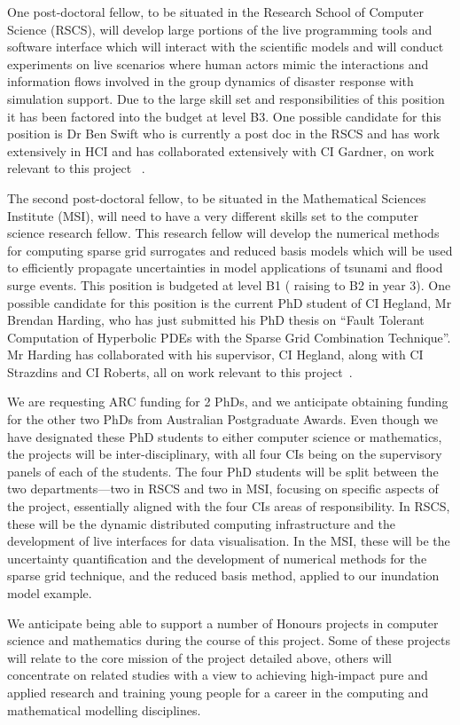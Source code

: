 One post-doctoral fellow, to be situated in the
Research School of Computer Science (RSCS), will develop large
portions of the live programming tools and software interface which
will interact with the scientific models and will conduct experiments
on live scenarios where human actors mimic the interactions and
information flows involved in the group dynamics of disaster response
with simulation support. Due to the large skill set and responsibilities of 
this position it has been factored into the budget at level B3.
One possible candidate for this position is 
Dr Ben Swift who is currently a post doc in the RSCS and has work 
extensively in HCI and has collaborated extensively with CI Gardner, on work 
relevant to this project ~\parencite{martin2015tracking,martin2016intelligent,swiftLive2016,
swift2013visual,swift2014coding}.

The second post-doctoral fellow, to be
situated in the Mathematical Sciences Institute (MSI), 
will need to have a very different skills set to the computer 
science research fellow. This research fellow will develop
the numerical methods for computing sparse grid surrogates and reduced
basis models which will be used to efficiently propagate 
uncertainties in
model applications of tsunami and flood surge events. This 
position is budgeted at level B1 ( raising to B2 in year 3).
One possible candidate for this position is the current PhD 
student of CI Hegland, Mr Brendan Harding,  who has just 
submitted his PhD thesis on ``Fault Tolerant Computation of
Hyperbolic PDEs with the Sparse Grid Combination Technique''.
Mr Harding has collaborated with his supervisor, 
CI Hegland, along with CI Strazdins and CI Roberts, all
on work relevant to this project~\parencite{Ali11022016,AliEtal2015,deBaarHarding2015,
HardingHLS2015,StrazdinsEtal2015}.


We are requesting ARC funding for 2 PhDs, and we anticipate obtaining funding for the other two PhDs
from  Australian Postgraduate Awards.  Even though we have designated these 
PhD students to either computer science or mathematics, the 
projects will be inter-disciplinary, with all four CIs being on the supervisory panels of 
each of the students. The four PhD students will be split between the two departments---two
in RSCS and two in MSI, focusing on specific aspects of the project,
essentially aligned with the four CIs areas of responsibility.  In
RSCS, these will be the dynamic distributed computing infrastructure
and the development of live interfaces for data visualisation. In the
MSI, these will be the uncertainty quantification and the development
of numerical methods for the sparse grid technique, and the reduced
basis method, applied to our inundation model example.


We anticipate being able to support a number of Honours projects in
computer science and mathematics during the course of this
project. Some of these projects will relate to the core mission of the
project detailed above, others will concentrate on related studies
with a view to achieving high-impact pure and applied research and
training young people for a career in the computing and mathematical
modelling disciplines.

